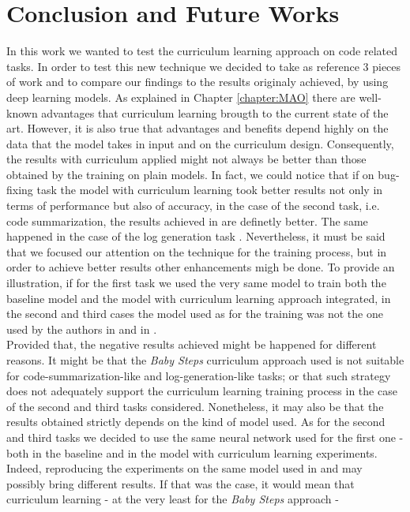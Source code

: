 \chapter{Conclusion and Future Works}
In this work we wanted to test the curriculum learning approach on code related tasks.
In order to test this new technique we decided to take as reference 3 pieces of work and to compare 
our findings to the results originaly achieved, by using deep learning models.
As explained in Chapter \ref{chapter:MAO} there are well-known advantages that curriculum learning
brougth to the current state of the art. However, it is also true that advantages and benefits depend highly on the data 
that the model takes in input and on the curriculum design. Consequently, the results with curriculum applied might not always be better than 
those obtained by the training on plain models. 
In fact, we could notice that if on bug-fixing task the model with curriculum learning 
took better results not only in terms of performance but also of accuracy, 
in the case of the second task, i.e. code summarization, the results achieved in \cite{Leclair2020}
are definetly better. The same happened in the case of the log generation task \cite{Mastropaolo2022}.
Nevertheless, it must be said that we focused our attention on the technique for the training process, but in order to achieve better 
results other enhancements migh be done. To provide an illustration, if for the first task we used the very same model 
to train both the baseline model and the model with curriculum learning approach integrated, in the second and third cases the model used as for the training was not the 
one used by the authors in \cite{Leclair2020} and in \cite{Mastropaolo2022}. \\
Provided that, the negative results achieved might be happened for different reasons.
It might be that 
the \textit{Baby Steps} curriculum approach used is not suitable for code-summarization-like and log-generation-like tasks;
or that such strategy does not adequately support the curriculum learning training process in the case of the second and third tasks considered.
Nonetheless, it may also be that the results obtained 
strictly depends on the kind of model used. As for the second and third tasks we decided to use the same neural network used 
for the first one - both in the baseline and in the model with curriculum learning experiments.
Indeed, 
reproducing the experiments on the same model used in \cite{Leclair2020} and \cite{Mastropaolo2022} may possibly bring different results.
If that was the case, it would mean that curriculum learning - at the very least for the \textit{Baby Steps} approach - 

